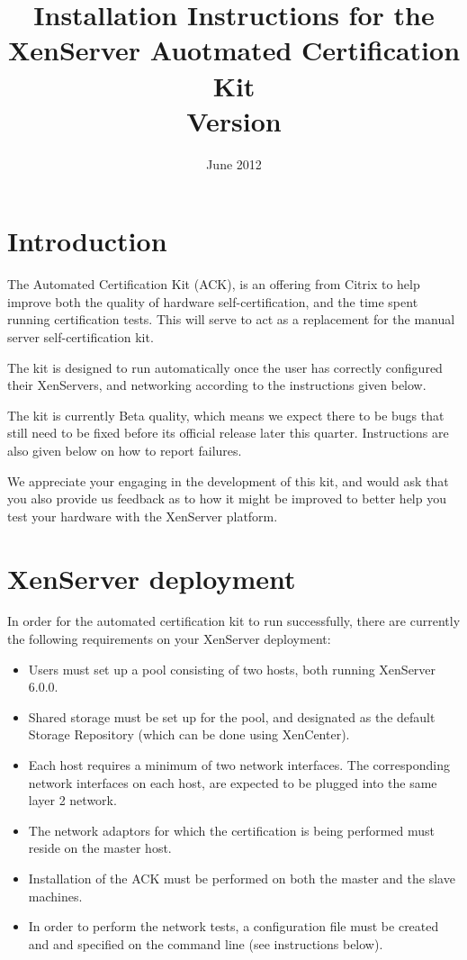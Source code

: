 \documentclass[a4paper,11pt]{article}
\title{Installation Instructions for the XenServer Auotmated Certification Kit\\\normalsize Version \versionnumber}
\date{June 2012}
\begin{document}
\maketitle

\section{Introduction}
The Automated Certification Kit (ACK), is an offering from Citrix to help improve both the quality of hardware self-certification, and the time spent running certification tests. This will serve to act as a replacement for the manual server self-certification kit.

The kit is designed to run automatically once the user has correctly configured their XenServers, and networking according to the instructions given below. 

The kit is currently Beta quality, which means we expect there to be bugs that still need to be fixed before its official release later this quarter. Instructions are also given below on how to report failures. 

We appreciate your engaging in the development of this kit, and would ask that you also provide us feedback as to how it might be improved to better help you test your hardware with the XenServer platform.

\section{XenServer deployment}
In order for the automated certification kit to run successfully, there are currently the following requirements on your XenServer deployment:
\begin{itemize}
\item Users must set up a pool consisting of two hosts, both running XenServer 6.0.0.
\item Shared storage must be set up for the pool, and designated as the default Storage Repository (which can be done using XenCenter).
\item Each host requires a minimum of two network interfaces. The corresponding network interfaces on each host, are expected to be plugged into the same layer 2 network.
\item The network adaptors for which the certification is being performed must reside on the master host.
\item Installation of the ACK must be performed on both the master and the slave machines.
\item In order to perform the network tests, a configuration file must be created and and specified on the command line (see instructions below).
\end{itemize}
\end{document}
